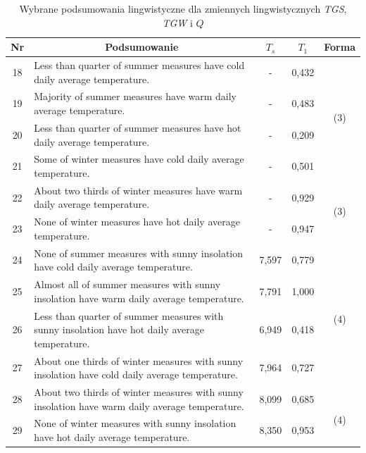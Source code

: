 \documentclass{classrep}
\begin{document}
\begin{table}[H]
\begin{center}
\begin{tabularx}{\linewidth}{ |c|X|c|c|c| } 
\hline
Nr & \multicolumn{1}{|c|}{Podsumowanie} & $T_s$ & $T_1$ & Forma \\
\hline
18	&	Less than quarter of summer measures have cold daily average temperature.	&	-	&	0,432	& \multirow{3}{1em}{\newline\newline(3)} \\ \cline{1-4}
19	&	Majority of summer measures have warm daily average temperature.	&	-	&	0,483	& \\	\cline{1-4}
20	&	Less than quarter of summer measures have hot daily average temperature.	&	-	&	0,209	& \\	\hline\hline
21	&	Some of winter measures have cold daily average temperature.	&	-	&	0,501 & \multirow{3}{1em}{\newline\newline(3)} \\ \cline{1-4}	
22	&	About two thirds of winter measures have warm daily average temperature.	&	-	&	0,929	& \\	\cline{1-4}
23	&	None of winter measures have hot daily average temperature.	&	-	&	0,947	& \\	\hline\hline

24	&	None of summer measures with sunny insolation have cold daily average temperature.	&	7,597	&	0,779  & \multirow{3}{1em}{\newline\newline\newline(4)} \\ \cline{1-4}			
25    &	Almost all of summer measures with sunny insolation have warm daily average temperature.	&	7,791	&	1,000	& \\	\cline{1-4}
26	&	Less than quarter of summer measures with sunny insolation have hot daily average temperature.	&	6,949	&	0,418	& \\	\hline\hline

27	&	About one thirds of winter measures with sunny insolation have cold daily average temperature.	&	7,964	&	0,727 & \multirow{3}{1em}{\newline\newline\newline(4)} \\ \cline{1-4}	
28	&	About two thirds of winter measures with sunny insolation have warm daily average temperature.	&	8,099	&	0,685	& \\	\cline{1-4}
29	&	None of winter measures with sunny insolation have hot daily average temperature.	&	8,350	&	0,953	& \\ \hline

\end{tabularx}
\caption{Wybrane podsumowania lingwistyczne dla zmiennych lingwistycznych \textit{TGS}, \textit{TGW} i $Q$}
\end{center}
\end{table}
\end{document}
